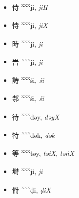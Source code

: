 \begin{itemize}
    \item {\Large{侍}} %
    {\large{{\textsuperscript{xxx}}ji}},
    \textit{jiH}             %

    \item {\Large{恃}} %
    {\large{{\textsuperscript{xxx}}ji}},
    \textit{jiX}             %

    \item {\Large{時}} %
    {\large{{\textsuperscript{xxx}}ji}},
    \textit{ji}              %

    \item {\Large{旹}} %
    {\large{{\textsuperscript{xxx}}ji}},
    \textit{ji}              %

    \item {\Large{詩}} %
    {\large{{\textsuperscript{xxx}}śi}},
    \textit{śi}              %

    \item {\Large{邿}} %
    {\large{{\textsuperscript{xxx}}śi}},
    \textit{śi}              %

    \item {\Large{待}} %
    {\large{{\textsuperscript{xxx}}dəy}},
    \textit{dəyX}            %

    \item {\Large{特}} %
    {\large{{\textsuperscript{xxx}}dək}},
    \textit{dək}             %

    \item {\Large{等}} %
    {\large{{\textsuperscript{xxx}}təy}},
    \textit{təiX}, \textit{təṅX}     %

    \item {\Large{塒}} %
    {\large{{\textsuperscript{xxx}}ji}},
    \textit{ji}              %

    \item {\Large{偫}} %
    {\large{{\textsuperscript{xxx}}ḍi}},
    \textit{ḍiX}             %

\end{itemize}

